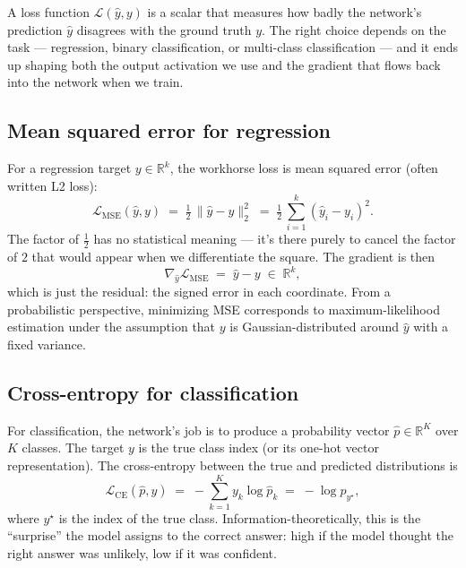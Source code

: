 \documentclass[11pt, a4paper]{article}
\newcommand{\R}{\mathbb{R}}
\newcommand{\Loss}{\mathcal{L}}
\begin{document}
A loss function $\Loss(\hat y, y)$ is a scalar that measures how badly the network's prediction $\hat y$ disagrees with the ground truth $y$. The right choice depends on the task --- regression, binary classification, or multi-class classification --- and it ends up shaping both the output activation we use and the gradient that flows back into the network when we train.

\subsection{Mean squared error for regression}

For a regression target $y \in \R^k$, the workhorse loss is mean squared error (often written L2 loss):
\begin{equation}
    \Loss_{\mathrm{MSE}}(\hat y, y) \;=\; \tfrac{1}{2}\,\|\hat y - y\|_2^2 \;=\; \tfrac{1}{2}\,\textstyle\sum_{i=1}^k (\hat y_i - y_i)^2.
\end{equation}
The factor of $\tfrac{1}{2}$ has no statistical meaning --- it's there purely to cancel the factor of $2$ that would appear when we differentiate the square. The gradient is then
\begin{equation}
    \nabla_{\hat y} \Loss_{\mathrm{MSE}} \;=\; \hat y - y \;\in\; \R^k,
\end{equation}
which is just the residual: the signed error in each coordinate. From a probabilistic perspective, minimizing MSE corresponds to maximum-likelihood estimation under the assumption that $y$ is Gaussian-distributed around $\hat y$ with a fixed variance.

\subsection{Cross-entropy for classification}

For classification, the network's job is to produce a probability vector $\hat p \in \R^K$ over $K$ classes. The target $y$ is the true class index (or its one-hot vector representation). The cross-entropy between the true and predicted distributions is
\begin{equation}
    \Loss_{\mathrm{CE}}(\hat p, y) \;=\; -\sum_{k=1}^K y_k \log \hat p_k \;=\; -\log \hat p_{y^\star},
\end{equation}
where $y^\star$ is the index of the true class. Information-theoretically, this is the ``surprise'' the model assigns to the correct answer: high if the model thought the right answer was unlikely, low if it was confident.
\end{document}
